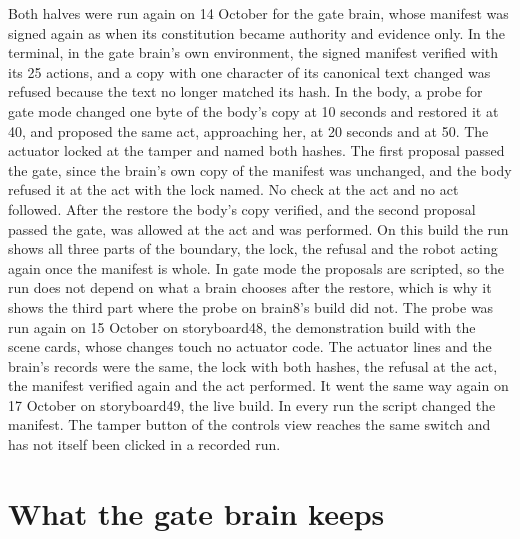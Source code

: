 Both halves were run again on 14 October for the gate brain, whose manifest was signed again as
 when its constitution became authority and evidence only. In the terminal, in the
gate brain's own environment, the signed manifest verified with its 25 actions, and a copy with
one character of its canonical text changed was refused because the text no longer matched its
hash.
In the body, a probe for gate mode changed one byte of the body's copy at 10 seconds and restored
it at 40, and proposed the same act, approaching her, at 20 seconds and at 50. The actuator locked
at the tamper and named both hashes. The first proposal passed the gate, since the brain's own copy
of the manifest was unchanged, and the body refused it at the act with the lock named. No check at
the act and no act followed. After the restore the body's copy verified, and the second proposal
passed the gate, was allowed at the act and was performed. On this build the run shows all three
parts of the boundary, the lock, the refusal and the robot acting again once the manifest is
whole. In gate mode the proposals are scripted, so the run does not depend on what a brain chooses
after the restore, which is why it shows the third part where the probe on brain8's build did not.
The probe was run again on 15 October on storyboard48, the demonstration build with the scene
cards, whose changes touch no actuator code. The actuator lines and the brain's records were the
same, the lock with both hashes, the refusal at the act, the manifest verified again and the act
performed. It went the same way again on 17 October on storyboard49, the live build. In every run
the script changed the manifest. The tamper button of the controls view reaches the same switch
and has not itself been clicked in a recorded run.

\section{What the gate brain keeps}\label{sec:cont-brain8}

